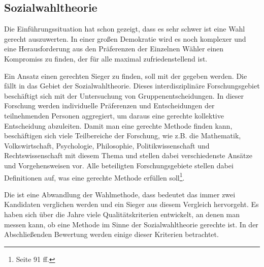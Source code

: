 \subsection{Sozialwahltheorie} 
\label{sec:problemstellung}
Die Einführungssituation hat schon gezeigt, dass es sehr schwer ist eine Wahl gerecht auszuwerten. In einer großen Demokratie wird es noch komplexer und eine Herausforderung aus den Präferenzen der Einzelnen Wähler einen Kompromiss zu finden, der für alle maximal zufriedenstellend ist.

Ein Ansatz einen gerechten Sieger zu finden, soll mit der \schulze gegeben werden. Die \schulze fällt in das Gebiet der Sozialwahltheorie. Dieses interdisziplinäre Forschungsgebiet beschäftigt sich mit der Untersuchung von Gruppenentscheidungen. In dieser Forschung werden individuelle Präferenzen und Entscheidungen der teilnehmenden Personen aggregiert, um daraus eine \glqq gerechte\grqq{} kollektive Entscheidung abzuleiten. Damit man eine \glqq gerechte\grqq{} Methode finden kann, beschäftigen sich viele Teilbereiche der Forschung, wie z.B. die Mathematik, Volkswirtschaft, Psychologie, Philosophie, Politikwissenschaft und Rechtswissenschaft mit diesem Thema und stellen dabei verschiedenste Ansätze und Vorgehensweisen vor. Alle beteiligten Forschungsgebiete stellen dabei Definitionen auf, was eine \glqq gerechte\grqq{} Methode erfüllen soll\footnote{\Vgl \citet{scheubrein2013computerunterstuetzte} Seite 91 ff.}.

Die \schulze ist eine Abwandlung der \condorcet Wahlmethode, dass bedeutet das immer zwei Kandidaten verglichen werden und ein Sieger aus diesem Vergleich hervorgeht. Es haben sich über die Jahre viele Qualitätskriterien entwickelt, an denen man messen kann, ob eine Methode im Sinne der Sozialwahltheorie gerechte ist. In der Abschließenden Bewertung werden einige dieser Kriterien betrachtet.





